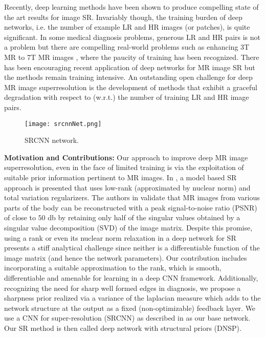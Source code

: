 \documentclass{article}
\def\sqz{\vspace{-3pt}}
\begin{document}
Recently, deep learning methods have been shown to produce compelling state of the art results \cite{dong2016image,kim2016accurate,guo2017deep,wang2015deep,dong2016accelerating,timofte2017ntire,kim2016deeply} for image SR.  Invariably though, the training burden of deep networks, i.e. the number of example LR and HR images (or patches), is quite significant. In some medical diagnosis problems, generous LR and HR pairs is not a problem but there are compelling real-world problems such as enhancing 3T MR to 7T MR images \cite{bahrami2016reconstruction}, where the paucity of training has been recognized.  There has been encouraging recent application of deep networks for MR image SR \cite{yang2016super, srinivasan2017super} but the methods remain training intensive. An outstanding open challenge for deep MR image superresolution is the development of methods that exhibit a graceful degradation with respect to (w.r.t.) the number of training LR and HR image pairs. \\
\begin{figure}
	\begin{center}
		\texttt{[image: srcnnNet.png]}
	\end{center}
	\vspace{-.5cm}\sqz
	\caption{\small{SRCNN network.}}\sqz\sqz\sqz\sqz\sqz\sqz\sqz\sqz\sqz
	\label{fig:SRCNN}
\end{figure}
\textbf{Motivation and Contributions:} Our approach to improve deep MR image superresolution, even in the face of limited training is via the exploitation of suitable prior information pertinent to MR images. In \cite{shi2015lrtv}, a model based SR approach is presented that uses low-rank (approximated by nuclear norm) and total variation regularizers. The authors in \cite{shi2015lrtv} validate that MR images from various parts of the body can be reconstructed with a peak signal-to-noise ratio (PSNR) of close to $50$ db by retaining only half of the singular values obtained by a singular value decomposition (SVD) of the image matrix. Despite this promise, using a rank or even its nuclear norm relaxation in a deep network for SR presents a stiff analytical challenge since neither is a differentiable function of the image matrix (and hence the network parameters). Our contribution includes incorporating a suitable approximation to the rank, which is smooth, differentiable and amenable for learning in a deep CNN framework. Additionally, recognizing the need for sharp well formed edges in diagnosis, we propose a sharpness prior realized via a variance of the laplacian measure which adds to the network structure at the output as a fixed (non-optimizable) feedback layer.  We use a CNN for super-resolution (SRCNN) as described in \cite{dong2016image} as our base network. Our SR method is then called deep network with structural priors (DNSP).
\end{document}
